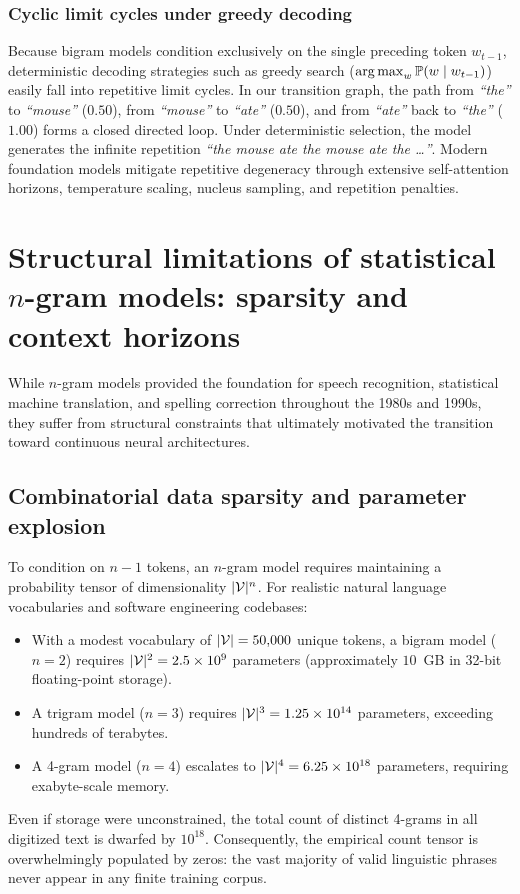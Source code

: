 \documentclass[../../main.tex]{subfiles}
\begin{document}
\subsubsection{Cyclic limit cycles under greedy decoding}
Because bigram models condition exclusively on the single preceding token $w_{t-1}$, deterministic decoding strategies such as greedy search ($\operatorname*{\mathrm{arg\,max}}_{w} \mathbb{P}(w \mid w_{t-1})$) easily fall into repetitive limit cycles. In our transition graph, the path from \textit{``the''} to \textit{``mouse''} ($0.50$), from \textit{``mouse''} to \textit{``ate''} ($0.50$), and from \textit{``ate''} back to \textit{``the''} ($1.00$) forms a closed directed loop. Under deterministic selection, the model generates the infinite repetition \textit{``the mouse ate the mouse ate the \dots''}. Modern foundation models mitigate repetitive degeneracy through extensive self-attention horizons, temperature scaling, nucleus sampling, and repetition penalties.

\clearpage
\section{Structural limitations of statistical $n$-gram models: sparsity and context horizons}
\label{sec:ngram_limitations}

While $n$-gram models provided the foundation for speech recognition, statistical machine translation, and spelling correction throughout the 1980s and 1990s, they suffer from structural constraints that ultimately motivated the transition toward continuous neural architectures.

\subsection{Combinatorial data sparsity and parameter explosion}
To condition on $n-1$ tokens, an $n$-gram model requires maintaining a probability tensor of dimensionality $|\mathcal{V}|^n$. For realistic natural language vocabularies and software engineering codebases:
\begin{itemize}
    \item With a modest vocabulary of $|\mathcal{V}| = 50{,}000$ unique tokens, a bigram model ($n=2$) requires $|\mathcal{V}|^2 = 2.5 \times 10^9$ parameters (approximately $10$~GB in 32-bit floating-point storage).
    \item A trigram model ($n=3$) requires $|\mathcal{V}|^3 = 1.25 \times 10^{14}$ parameters, exceeding hundreds of terabytes.
    \item A 4-gram model ($n=4$) escalates to $|\mathcal{V}|^4 = 6.25 \times 10^{18}$ parameters, requiring exabyte-scale memory.
\end{itemize}
Even if storage were unconstrained, the total count of distinct 4-grams in all digitized text is dwarfed by $10^{18}$. Consequently, the empirical count tensor is overwhelmingly populated by zeros: the vast majority of valid linguistic phrases never appear in any finite training corpus.
\end{document}
